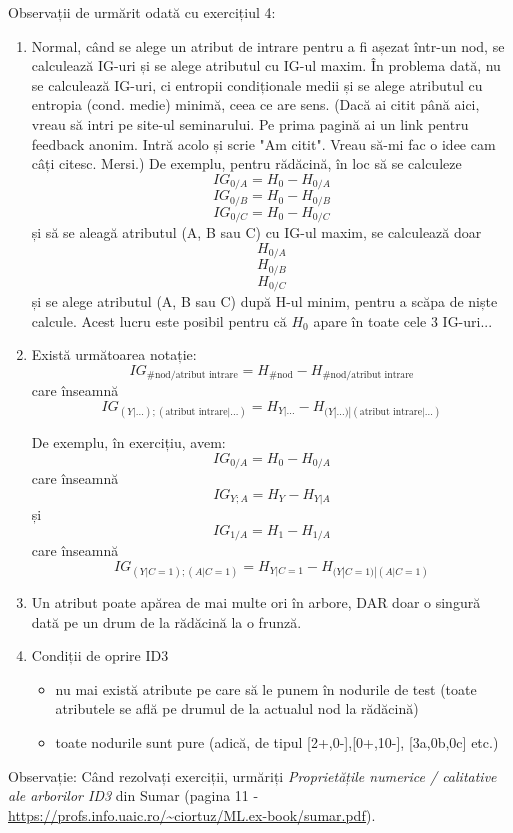 \documentclass[12pt]{article}
\begin{document}
	Observații de urmărit odată cu exercițiul 4:
	\begin{enumerate}
		\item Normal, când se alege un atribut de intrare pentru a fi așezat într-un nod, se calculează IG-uri și se alege atributul cu IG-ul maxim. În problema dată, nu se calculează IG-uri, ci entropii condiționale medii și se alege atributul cu entropia (cond. medie) minimă, ceea ce are sens. (Dacă ai citit până aici, vreau să intri pe site-ul seminarului. Pe prima pagină ai un link pentru feedback anonim. Intră acolo și scrie "Am citit". Vreau să-mi fac o idee cam câți citesc. Mersi.) De exemplu, pentru rădăcină, în loc să se calculeze
		$$IG_{0/A} = H_0 - H_{0/A}$$
		$$IG_{0/B} = H_0 - H_{0/B}$$
		$$IG_{0/C} = H_0 - H_{0/C}$$
		și să se aleagă atributul (A, B sau C) cu IG-ul maxim, se calculează doar 
		$$H_{0/A}$$
		$$H_{0/B}$$
		$$H_{0/C}$$
		și se alege atributul (A, B sau C) după H-ul minim, pentru a scăpa de niște calcule. Acest lucru este posibil pentru că $H_0$ apare în toate cele 3 IG-uri...
		
		\item Există următoarea notație: 
		$$IG_\text{\#nod/atribut intrare} = H_\text{\#nod} - H_\text{\#nod/atribut intrare}$$
		care înseamnă
		$$IG_{(Y|\dots);(\text{atribut intrare}|\dots)} = H_{Y|\dots} - H_{(Y|\dots)|(\text{atribut intrare}|\dots)}$$
		
		De exemplu, în exercițiu, avem:
		$$IG_{0/A} = H_0 - H_{0/A}$$
		care înseamnă
		$$IG_{Y;A} = H_Y - H_{Y|A}$$
		și 
		$$IG_{1/A} = H_1 - H_{1/A}$$
		care înseamnă
		$$IG_{(Y|C=1);(A|C=1)} = H_{Y|C=1} - H_{(Y|C=1)|(A|C=1)}$$
		
		\item Un atribut poate apărea de mai multe ori în arbore, DAR doar o singură dată pe un drum de la rădăcină la o frunză.
		
		\item Condiții de oprire ID3
		\begin{itemize}
			\item nu mai există atribute pe care să le punem în nodurile de test (toate atributele se află pe drumul de la actualul nod la rădăcină)
			\item toate nodurile sunt pure (adică, de tipul [2+,0-],[0+,10-], [3a,0b,0c] etc.)
		\end{itemize}
	\end{enumerate}
	
	Observație: Când rezolvați exerciții, urmăriți \textit{Proprietățile numerice / calitative ale arborilor ID3} din Sumar (pagina 11 - \url{https://profs.info.uaic.ro/~ciortuz/ML.ex-book/sumar.pdf}). 
	
\end{document}
